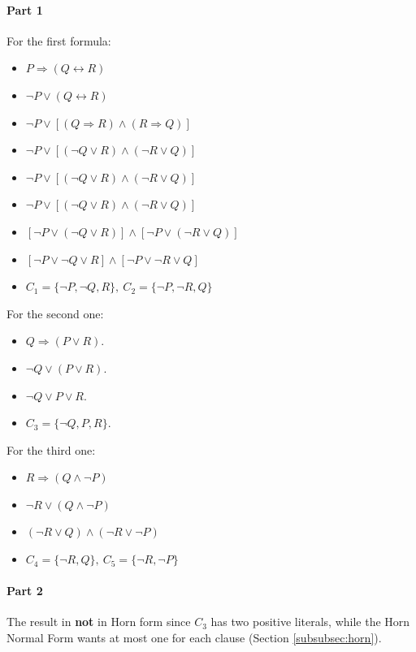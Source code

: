 \documentclass[10pt,a4paper]{article}
\begin{document}
\paragraph{Part 1}

For the first formula:
\begin{itemize}
\item $P \Rightarrow (Q \leftrightarrow R)$
\item $\neg P \vee (Q \leftrightarrow R)$
\item $\neg P \vee [(Q \Rightarrow R) \wedge (R \Rightarrow Q)]$
\item $\neg P \vee [(\neg Q \vee R) \wedge (\neg R \vee Q)]$
\item $\neg P \vee [(\neg Q \vee R) \wedge (\neg R \vee Q)]$
\item $\neg P \vee [(\neg Q \vee R) \wedge (\neg R \vee Q)]$
\item $[\neg P \vee (\neg Q \vee R)] \wedge [\neg P \vee  (\neg R \vee Q)]$
\item $[\neg P \vee \neg Q \vee R] \wedge [\neg P \vee  \neg R \vee Q]$
\item $C_1=\lbrace \neg P, \neg Q , R\rbrace,\ C_2=\lbrace \neg P,  \neg R, Q\rbrace$
\end{itemize}

For the second one:
\begin{itemize}
\item $Q \Rightarrow (P \vee R)$.
\item $\neg Q \vee (P \vee R)$.
\item $\neg Q \vee P \vee R$.
\item $C_3= \lbrace \neg Q, P, R\rbrace$.
\end{itemize}

For the third one:
\begin{itemize}
\item $R \Rightarrow (Q \wedge \neg P)$
\item $\neg R \vee (Q \wedge \neg P)$
\item $(\neg R \vee Q) \wedge( \neg R \vee \neg P)$
\item $C_4= \lbrace \neg R, Q\rbrace,\ C_5=\lbrace \neg R , \neg P\rbrace$

\end{itemize}

\paragraph{Part 2}
The result in \textbf{not} in Horn form since $C_3$ has two positive literals, while the Horn Normal Form wants at most one for each clause (Section \ref{subsubsec:horn}).
\end{document}
